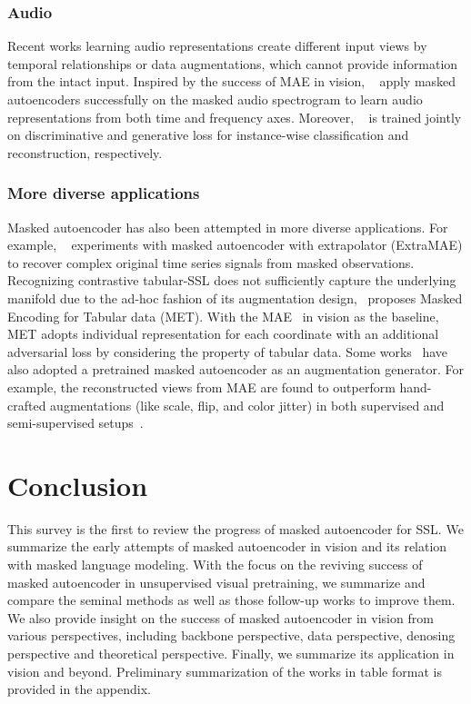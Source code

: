 \documentclass[10pt,journal,compsoc]{IEEEtran}
\newcommand{\CS}[1]{\textcolor{red}{[CS: #1]}}
\begin{document}
\subsubsection{Audio}

Recent works learning audio representations create different input views by temporal relationships or data augmentations, which cannot provide information from the intact input. Inspired by the success of MAE in vision, ~\cite{niizumi2022masked,baade2022mae} apply masked autoencoders successfully on the masked audio spectrogram to learn audio representations from both time and frequency axes. Moreover,  ~\cite{baade2022mae} is trained jointly on discriminative and generative loss for instance-wise classification and reconstruction, respectively. 

\subsubsection{More diverse applications}
Masked autoencoder has also been attempted in more diverse applications. For example, ~\cite{zha2022time} experiments with masked autoencoder with extrapolator (ExtraMAE) to recover complex original time series signals from masked observations. Recognizing contrastive tabular-SSL does not sufficiently capture the underlying manifold due to the ad-hoc fashion of its augmentation design,~\cite{majmundar2022met} proposes Masked Encoding for Tabular data (MET). With the MAE~\cite{he2022masked} in vision as the baseline, MET adopts individual representation for each coordinate with an additional adversarial loss by considering the property of tabular data. Some works~\cite{fang2022corrupted,xu2022masked} have also adopted a pretrained masked autoencoder as an augmentation generator. For example, the reconstructed views from MAE are found to outperform hand-crafted augmentations (like scale, flip, and color jitter) in both supervised and semi-supervised setups~\cite{xu2022masked}.


\section{Conclusion}
This survey is the first to review the progress of masked autoencoder for SSL. We summarize the early attempts of masked autoencoder in vision and its relation with masked language modeling. With the focus on the reviving success of masked autoencoder in unsupervised visual pretraining, we summarize and compare the seminal methods as well as those follow-up works to improve them. We also provide insight on the success of masked autoencoder in vision from various perspectives, including backbone perspective, data perspective, denosing perspective and theoretical perspective. Finally, we summarize its application in vision and beyond. Preliminary summarization of the works in table format is provided in the appendix. 
\end{document}
